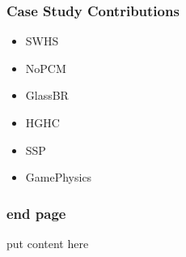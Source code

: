 \documentclass{beamer}
\begin{document}
\begin{frame}
\frametitle{Case Study Contributions}
\begin{itemize}
\item SWHS
\item NoPCM
\item GlassBR
\item HGHC
\item SSP
\item GamePhysics
\end{itemize}
\end{frame}

\begin{frame}
\frametitle{end page}
put content here
\end{frame}
\end{document}
